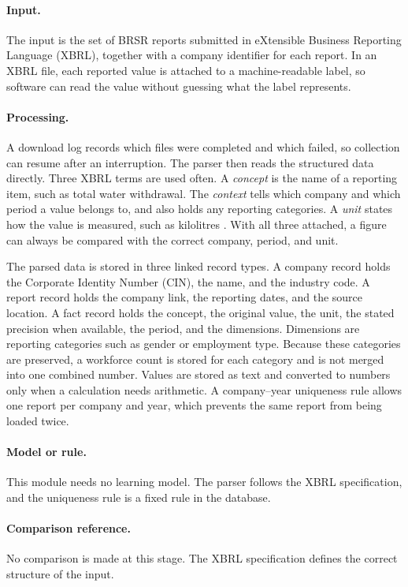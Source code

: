 \paragraph{Input.} The input is the set of BRSR reports submitted in eXtensible Business Reporting Language (XBRL), together with a company identifier for each report. In an XBRL file, each reported value is attached to a machine-readable label, so software can read the value without guessing what the label represents.

\paragraph{Processing.} A download log records which files were completed and which failed, so collection can resume after an interruption. The parser then reads the structured data directly. Three XBRL terms are used often. A \emph{concept} is the name of a reporting item, such as total water withdrawal. The \emph{context} tells which company and which period a value belongs to, and also holds any reporting categories. A \emph{unit} states how the value is measured, such as kilolitres \cite{xbrl2013}. With all three attached, a figure can always be compared with the correct company, period, and unit.

The parsed data is stored in three linked record types. A company record holds the Corporate Identity Number (CIN), the name, and the industry code. A report record holds the company link, the reporting dates, and the source location. A fact record holds the concept, the original value, the unit, the stated precision when available, the period, and the dimensions. Dimensions are reporting categories such as gender or employment type. Because these categories are preserved, a workforce count is stored for each category and is not merged into one combined number. Values are stored as text and converted to numbers only when a calculation needs arithmetic. A company--year uniqueness rule allows one report per company and year, which prevents the same report from being loaded twice.

\paragraph{Model or rule.} This module needs no learning model. The parser follows the XBRL specification, and the uniqueness rule is a fixed rule in the database.

\paragraph{Comparison reference.} No comparison is made at this stage. The XBRL specification \cite{xbrl2013} defines the correct structure of the input.

